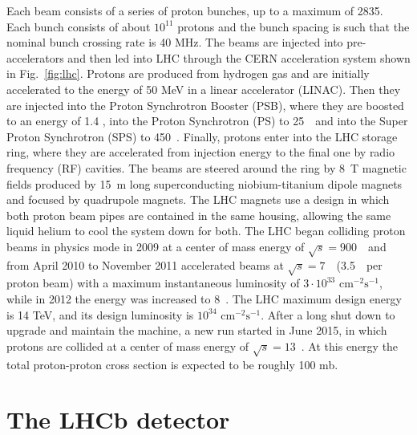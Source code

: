 Each beam consists of a series of proton bunches, up to a maximum of 2835. Each bunch consists of about $10^{11}$
protons and the bunch spacing is such that the nominal bunch crossing rate is 40 MHz. The beams are injected into
pre-accelerators and then led into LHC through the CERN acceleration system shown in Fig.~\ref{fig:lhc}. Protons are
produced from hydrogen gas and are initially accelerated to the energy of 50 MeV in a linear accelerator (LINAC).
Then they are injected into the Proton Synchrotron Booster (PSB), where they are boosted to an energy of 1.4 \gev,
into the Proton Synchrotron (PS) to 25~\gev~and into the Super Proton Synchrotron (SPS) to 450~\gev. Finally, protons
enter into the LHC storage ring, where they are accelerated from injection energy to the final one
by radio frequency (RF) cavities. The beams are steered around the ring by 8~T magnetic fields produced by 15~m long
superconducting niobium-titanium dipole magnets and focused by quadrupole magnets. The LHC magnets
use a design in which both proton beam pipes are contained in the same housing, allowing the same liquid helium to cool 
the system down for both. The LHC began colliding proton beams in physics mode in 2009 at a center of mass
energy of $\sqrt{s} = 900$~\gev~and from April 2010 to November 2011 accelerated beams at $\sqrt{s} = 7$~\tev~(3.5~\tev~per
proton beam) with a maximum instantaneous luminosity of $3\cdot10^{33} \text{ cm}^{-2}\text{s}^{-1}$, while in
2012 the energy was increased to 8~\tev. The LHC maximum design energy is 14 TeV, and its design
luminosity is $10^{34} \text{ cm}^{-2}\text{s}^{-1}$. After a long shut down to upgrade and maintain the machine, a
new run started in June 2015, in which protons are collided at a center of mass energy of $\sqrt{s} = 13$~\tev. At this
energy the total proton-proton cross section is expected to be roughly 100 mb.

\section{The LHCb detector}

